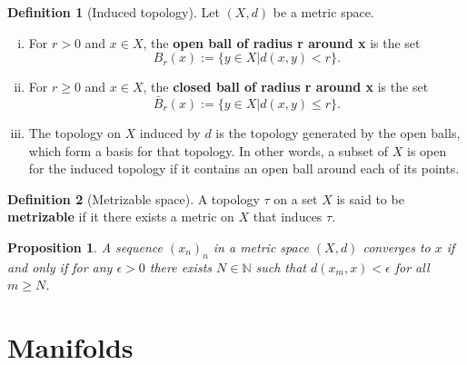 \documentclass[a4paper,12pt,parskip=half*,chapterprefix=true,numbers=noendperiod]{scrreprt}
\newtheorem{proposition}{Proposition}[section]
\theoremstyle{definition}
\newtheorem{definition}{Definition}[section]
\theoremstyle{remark}
\begin{document}
\begin{definition}[Induced topology]
	Let $(X,d)$ be a metric space.
	\begin{enumerate}[(i)]
		\item For $r>0$ and $x\in X$, the \textbf{open ball of radius r around x} is the set
		\begin{equation*}
			B_r(x):=\{y\in X|d(x,y)<r\}.
		\end{equation*}
		\item For $r\geq 0$ and $x\in X$, the \textbf{closed ball of radius r around x} is the set
		\begin{equation*}
			\bar{B}_r(x):=\{y\in X|d(x,y)\leq r\}.
		\end{equation*}
		\item The topology on $X$ induced by $d$ is the topology generated by the open balls, which form a basis for that topology. In other words, a subset of $X$ is open for the induced topology if it contains an open ball around each of its points.
	\end{enumerate}
\end{definition}

\begin{definition}[Metrizable space]
	A topology $\tau$ on a set $X$ is said to be \textbf{metrizable} if it there exists a metric on $X$ that induces $\tau$.
\end{definition}

\begin{proposition}
	A sequence $(x_n)_n$ in a metric space $(X,d)$ converges to $x$ if and only if for any $\epsilon>0$ there exists $N\in\mathbb{N}$ such that $d(x_m,x)<\epsilon$ for all $m\geq N$.
\end{proposition}

\part{Manifolds}



\printbibliography
\end{document}
